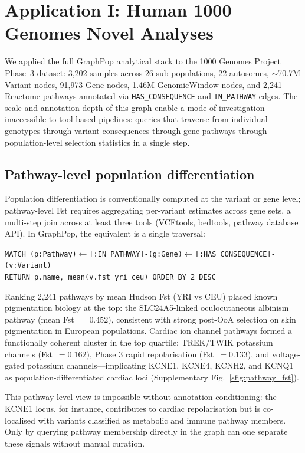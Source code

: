 \section*{Application I: Human 1000 Genomes Novel Analyses}

We applied the full GraphPop analytical stack to the 1000 Genomes Project Phase~3 dataset\cite{1000genomes2015global}: 3{,}202 samples across 26 sub-populations, 22 autosomes, $\sim$70.7M Variant nodes, 91{,}973 Gene nodes, 1.46M GenomicWindow nodes, and 2{,}241 Reactome pathways\cite{gillespie2022reactome} annotated via \texttt{HAS\_CONSEQUENCE} and \texttt{IN\_PATHWAY} edges. The scale and annotation depth of this graph enable a mode of investigation inaccessible to tool-based pipelines: queries that traverse from individual genotypes through variant consequences through gene pathways through population-level selection statistics in a single step.

\subsection*{Pathway-level population differentiation}

Population differentiation is conventionally computed at the variant or gene level; pathway-level Fst requires aggregating per-variant estimates across gene sets, a multi-step join across at least three tools (VCFtools, bedtools, pathway database API). In GraphPop, the equivalent is a single traversal:

\begin{center}
\texttt{MATCH (p:Pathway)$\leftarrow$[:IN\_PATHWAY]-(g:Gene)$\leftarrow$[:HAS\_CONSEQUENCE]-(v:Variant)}\\
\texttt{RETURN p.name, mean(v.fst\_yri\_ceu) ORDER BY 2 DESC}
\end{center}

Ranking 2{,}241 pathways by mean Hudson Fst (YRI vs CEU) placed known pigmentation biology at the top: the SLC24A5-linked oculocutaneous albinism pathway (mean Fst~$= 0.452$), consistent with strong post-OoA selection on skin pigmentation in European populations\cite{yi2010sequencing}. Cardiac ion channel pathways formed a functionally coherent cluster in the top quartile: TREK/TWIK potassium channels (Fst~$= 0.162$), Phase 3 rapid repolarisation (Fst~$= 0.133$), and voltage-gated potassium channels---implicating KCNE1, KCNE4, KCNH2, and KCNQ1 as population-differentiated cardiac loci (Supplementary Fig.~\ref{sfig:pathway_fst}).

This pathway-level view is impossible without annotation conditioning: the KCNE1 locus, for instance, contributes to cardiac repolarisation but is co-localised with variants classified as metabolic and immune pathway members. Only by querying pathway membership directly in the graph can one separate these signals without manual curation.

